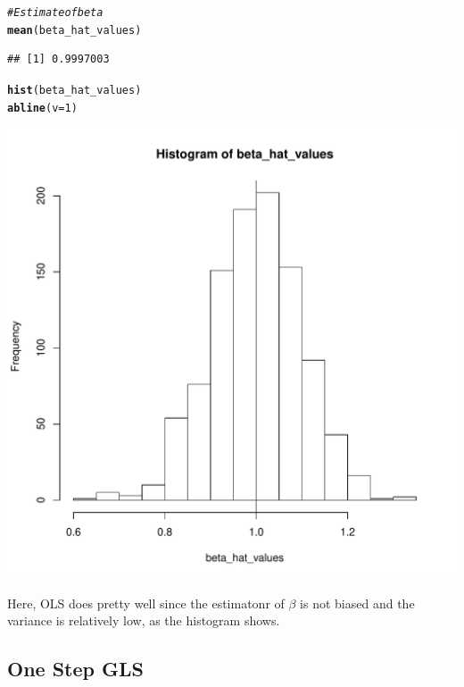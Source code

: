\documentclass[11pt]{article}\usepackage[]{graphicx}\usepackage[]{color}
\makeatletter
\def\maxwidth{ %
  \ifdim\Gin@nat@width>\linewidth
    \linewidth
  \else
    \Gin@nat@width
  \fi
}
\newcommand{\hlnum}[1]{\textcolor[rgb]{0.686,0.059,0.569}{#1}}%
\newcommand{\hlcom}[1]{\textcolor[rgb]{0.678,0.584,0.686}{\textit{#1}}}%
\newcommand{\hlstd}[1]{\textcolor[rgb]{0.345,0.345,0.345}{#1}}%
\newcommand{\hlkwc}[1]{\textcolor[rgb]{0.333,0.667,0.333}{#1}}%
\newcommand{\hlkwd}[1]{\textcolor[rgb]{0.737,0.353,0.396}{\textbf{#1}}}%
\newenvironment{kframe}{%
 \def\at@end@of@kframe{}%
 \ifinner\ifhmode%
  \def\at@end@of@kframe{\end{minipage}}%
  \begin{minipage}{\columnwidth}%
 \fi\fi%
 \def\FrameCommand##1{\hskip\@totalleftmargin \hskip-\fboxsep
 \colorbox{shadecolor}{##1}\hskip-\fboxsep
     \hskip-\linewidth \hskip-\@totalleftmargin \hskip\columnwidth}%
 \MakeFramed {\advance\hsize-\width
   \@totalleftmargin\z@ \linewidth\hsize
   \@setminipage}}%
 {\par\unskip\endMakeFramed%
 \at@end@of@kframe}
\newenvironment{knitrout}{}{} %
\makeatother
\begin{document}
\begin{knitrout}
\begin{kframe}
\begin{alltt}
\hlcom{# Estimate of beta}
\hlkwd{mean}\hlstd{(beta_hat_values)}
\end{alltt}
\begin{verbatim}
## [1] 0.9997003
\end{verbatim}
\begin{alltt}
\hlkwd{hist}\hlstd{(beta_hat_values)}
\hlkwd{abline}\hlstd{(}\hlkwc{v} \hlstd{=} \hlnum{1}\hlstd{)}
\end{alltt}
\end{kframe}
\includegraphics[width=\maxwidth]{figure/unnamed-chunk-3-1} 

\end{knitrout}
Here, OLS does pretty well since the estimatonr of $\beta$ is not biased and the variance is relatively low, as the histogram shows.

\subsection{One Step GLS}
\end{document}
